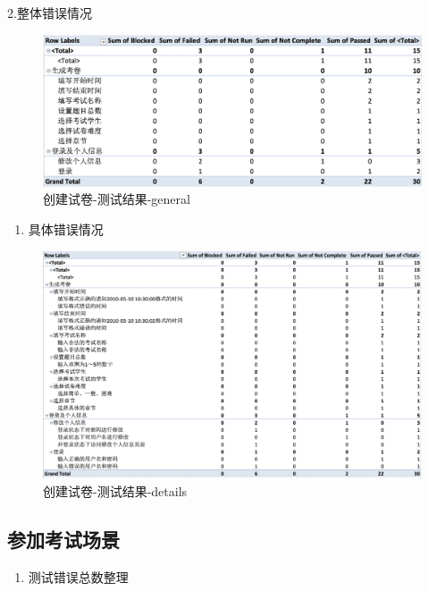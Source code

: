 \documentclass[hyperref, a4paper]{ctexart}
\providecommand{\tightlist}{%
  \setlength{\itemsep}{0pt}\setlength{\parskip}{0pt}}
\begin{document}
2.整体错误情况

\begin{figure}
\centering
\includegraphics{screenshoots/PivotTable_general_2.png}
\caption{创建试卷-测试结果-general}
\end{figure}

\begin{enumerate}
\def\labelenumi{\arabic{enumi}.}
\setcounter{enumi}{2}
\tightlist
\item
  具体错误情况
\end{enumerate}

\begin{figure}
\centering
\includegraphics{screenshoots/PivotTable_Details_2.png}
\caption{创建试卷-测试结果-details}
\end{figure}

\hypertarget{ux53c2ux52a0ux8003ux8bd5ux573aux666f-1}{%
\subsection{参加考试场景}\label{ux53c2ux52a0ux8003ux8bd5ux573aux666f-1}}

\begin{enumerate}
\def\labelenumi{\arabic{enumi}.}
\tightlist
\item
  测试错误总数整理
\end{enumerate}
\end{document}
